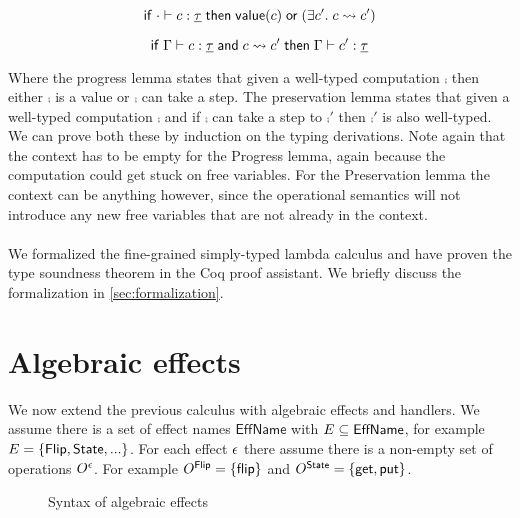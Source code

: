 {\begin{lemma}[Progress]
\[
	\mathsf{if}\;
		\cdot \vdash c : \underline{\tau}
	\;\mathsf{then}\;
		\mathsf{value}(c)
		\;\mathsf{or}\;
		(\exists c'.\; c \rightsquigarrow c')
\]
\end{lemma}

\begin{lemma}[Preservation]
\[
	\mathsf{if}\;
		\Gamma \vdash c : \underline{\tau}
		\;\mathsf{and}\;
		c \rightsquigarrow c'
	\;\mathsf{then}\;
		\Gamma \vdash c' : \underline{\tau}
\]
\end{lemma}

Where the progress lemma states that given a well-typed computation $\comp$ then either $\comp$ is a value or $\comp$ can take a  step. The preservation lemma states that given a well-typed computation $\comp$ and if $\comp$ can take a step to $\comp'$ then $\comp'$ is also well-typed. We can prove both these by induction on the typing derivations. Note again that the context has to be empty for the Progress lemma, again because the computation could get stuck on free variables. For the Preservation lemma the context can be anything however, since the operational semantics will not introduce any new free variables that are not already in the context.
\\\\
We formalized the fine-grained simply-typed lambda calculus and have proven the type soundness theorem in the Coq proof assistant.
We briefly discuss the formalization in \cref{sec:formalization}.

\newpage
\section{Algebraic effects} \label{sec:theory-algeff}

We now extend the previous calculus with algebraic effects and handlers.
We assume there is a set of effect names $\mathsf{EffName}$ with $E \subseteq \mathsf{EffName}$, for example $E = \{ \mathsf{Flip}, \mathsf{State}, ... \}$. For each effect $\epsilon$ there assume there is a non-empty set of operations $O^{\epsilon}$.
For example $O^{\mathsf{Flip}} = \{ \mathsf{flip} \}$ and $O^{\mathsf{State}} = \{ \mathsf{get}, \mathsf{put} \}$.

\begin{figure}
\caption{Syntax of algebraic effects}
\centering
{}
\end{figure}

}

